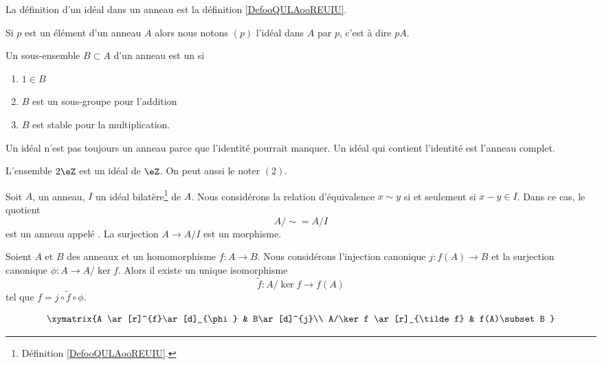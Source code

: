 La définition d'un idéal dans un anneau est la définition \ref{DefooQULAooREUIU}.


\begin{definition}  \label{DefSKTooOTauAR}
    Si \( p\) est un élément d'un anneau \( A\) alors nous notons \( (p)\) l'idéal dans \( A\)  par \( p\), c'est à dire \( pA\).
\end{definition}

\begin{definition}  \label{DefAJVTPxb}
    Un sous-ensemble \( B\subset A\) d'un anneau est un  si
    \begin{enumerate}
        \item
            \( 1\in B\)
        \item
            \( B\) est un sous-groupe pour l'addition
        \item
            \( B\) est stable pour la multiplication.
    \end{enumerate}
\end{definition}

\begin{remark}
    Un idéal n'est pas toujours un anneau parce que l'identité pourrait manquer. Un idéal qui contient l'identité est l'anneau complet.
\end{remark}

\begin{example}
    L'ensemble \( 2\eZ\) est un idéal de \( \eZ\). On peut aussi le noter \( (2) \).
\end{example}

Soit \( A\), un anneau, \( I\) un idéal bilatère\footnote{Définition \ref{DefooQULAooREUIU}.} de \( A\). Nous considérons la relation d'équivalence \( x\sim y\) si et seulement si \( x-y\in I\). Dans ce cas, le quotient
\begin{equation}
    A/\sim=A/I
\end{equation}
est un anneau appelé . La surjection \( A\to A/I\) est un morphisme.

\begin{proposition}
    Soient \( A\) et \( B\) des anneaux et un homomorphisme \( f\colon A\to B\). Nous considérons l'injection canonique \( j\colon f(A)\to B\) et la surjection canonique \( \phi\colon A\to A/\ker f\). Alors il existe un unique isomorphisme
    \begin{equation}
        \tilde f \colon A/\ker f\to f(A)
    \end{equation}
    tel que \( f=j\circ\tilde f\circ\phi\).

    \begin{equation}
        \xymatrix{%
        A \ar[r]^{f}\ar[d]_{\phi}        &   B\ar[d]^{j}\\
           A/\ker f \ar[r]_{\tilde f}   &   f(A)\subset B
           }
    \end{equation}
\end{proposition}

